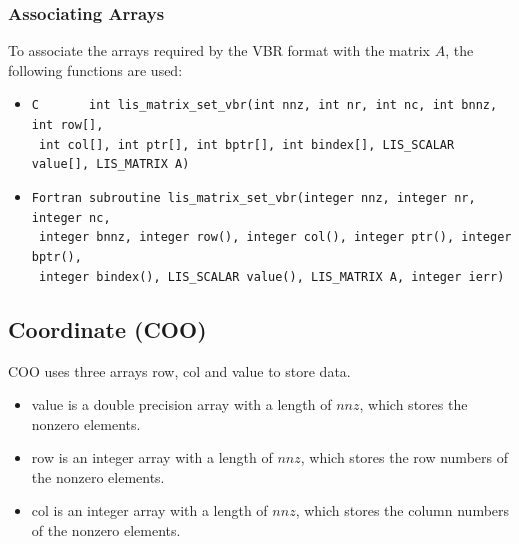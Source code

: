 \documentclass[a4paper]{article}
\begin{document}
\subsubsection{Associating Arrays}
To associate the arrays required by the VBR format with the matrix $A$, the following functions are used:
\begin{itemize}
\item \verb|C       int lis_matrix_set_vbr(int nnz, int nr, int nc, int bnnz, int row[],|\\
      \verb| int col[], int ptr[], int bptr[], int bindex[], LIS_SCALAR value[], LIS_MATRIX A)|
\item \verb|Fortran subroutine lis_matrix_set_vbr(integer nnz, integer nr, integer nc,|\\
      \verb| integer bnnz, integer row(), integer col(), integer ptr(), integer bptr(),|\\
      \verb| integer bindex(), LIS_SCALAR value(), LIS_MATRIX A, integer ierr) |
\end{itemize}

\newpage
\subsection{Coordinate (COO)}
COO uses three arrays {\ttfamily row}, {\ttfamily col} and {\ttfamily value} to store data.
\begin{itemize}
\item {\ttfamily value} is a double precision array with a length of
      $nnz$, which stores the nonzero elements.
\item {\ttfamily row} is an integer array with a length of $nnz$, which stores the row numbers of the nonzero elements.
\item {\ttfamily col} is an integer array with a length of $nnz$, which stores the column numbers of the nonzero elements.
\end{itemize}
\end{document}
